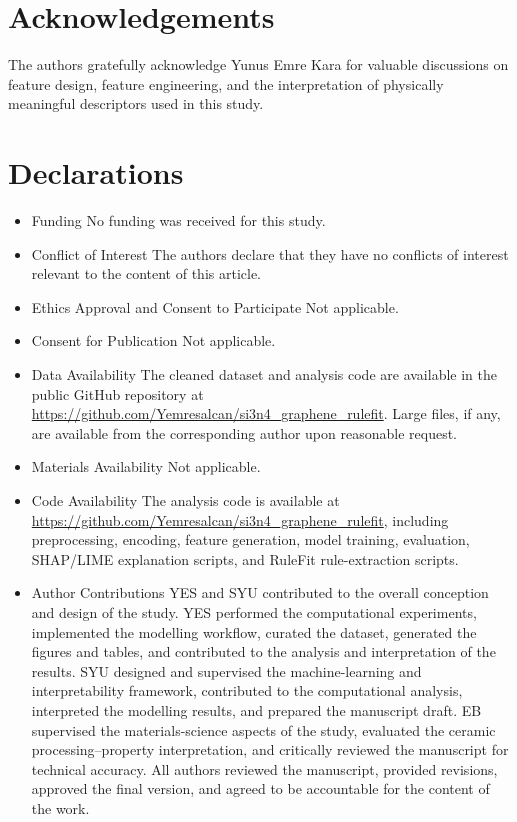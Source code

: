 \documentclass[pdflatex,sn-mathphys-num]{sn-jnl}%
\theoremstyle{thmstyleone}%
\theoremstyle{thmstyletwo}%
\theoremstyle{thmstylethree}%
\begin{document}
\section{Acknowledgements}

The authors gratefully acknowledge Yunus Emre Kara for valuable discussions on feature design, feature engineering, and the interpretation of physically meaningful descriptors used in this study.

\section{Declarations}


\begin{itemize}
    \item{Funding}
No funding was received for this study.

    \item{Conflict of Interest}
The authors declare that they have no conflicts of interest relevant to the content of this article.

    \item{Ethics Approval and Consent to Participate}
Not applicable.

    \item{Consent for Publication}
Not applicable.

    \item{Data Availability}
The cleaned dataset and analysis code are available in the public GitHub repository at \url{https://github.com/Yemresalcan/si3n4_graphene_rulefit}. Large files, if any, are available from the corresponding author upon reasonable request.
    \item{Materials Availability}
Not applicable.


    \item{Code Availability}
The analysis code is available at \url{https://github.com/Yemresalcan/si3n4_graphene_rulefit}, including preprocessing, encoding, feature generation, model training, evaluation, SHAP/LIME explanation scripts, and RuleFit rule-extraction scripts.


    \item{Author Contributions}
YES and SYU contributed to the overall conception and design of the study. YES performed the computational experiments, implemented the modelling workflow, curated the dataset, generated the figures and tables, and contributed to the analysis and interpretation of the results. SYU designed and supervised the machine-learning and interpretability framework, contributed to the computational analysis, interpreted the modelling results, and prepared the manuscript draft. EB supervised the materials-science aspects of the study, evaluated the ceramic processing--property interpretation, and critically reviewed the manuscript for technical accuracy. All authors reviewed the manuscript, provided revisions, approved the final version, and agreed to be accountable for the content of the work. 
\end{itemize}
\end{document}
